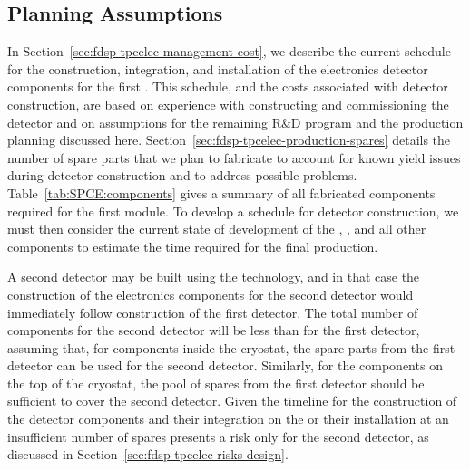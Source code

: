 \subsection{Planning Assumptions}
\label{sec:fdsp-tpcelec-management-planning}

In Section~\ref{sec:fdsp-tpcelec-management-cost}, we describe
the current schedule for the construction, integration, and installation
of the  electronics detector components for the first  
. This schedule, and the costs associated
with detector construction, are based on experience with constructing
and commissioning the 
detector and on assumptions for the remaining R\&D program
and the production planning discussed here. 
Section~\ref{sec:fdsp-tpcelec-production-spares} details
the number of spare parts that we plan to fabricate to
account for known yield issues during detector construction
and to address possible problems. Table~\ref{tab:SPCE:components}
gives a summary of all fabricated components required for the first 
 module. To develop a schedule for detector construction, 
we must then consider the current state of development of 
the , , and all other components to 
estimate the time required for the final production.

A second detector may be built using the  technology, 
and in that case the construction of the  electronics components 
for the second detector would immediately follow construction of 
the first detector. The total number of components for the second 
detector will be less than for the first detector, assuming that, 
for components inside the cryostat, the spare parts from the first 
detector can be used for the second detector. Similarly, for the 
components on the top of the cryostat, the pool of spares from the 
first detector should be sufficient to cover the second detector.
Given the timeline for the construction of the detector components
and their integration on the  or their installation at
 an insufficient number of spares presents a risk only
for the second detector, as discussed in Section~\ref{sec:fdsp-tpcelec-risks-design}.

